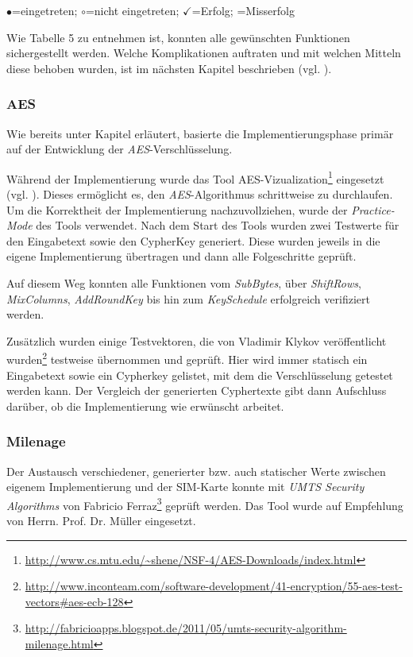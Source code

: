     \centerline{$\bullet$=eingetreten; $\circ$=nicht eingetreten; $\checkmark$=Erfolg; =Misserfolg}\vspace*{5mm}

    Wie Tabelle 5 zu entnehmen ist, konnten alle gewünschten Funktionen sichergestellt werden.
    Welche Komplikationen auftraten und mit welchen Mitteln diese behoben wurden, ist im
    nächsten Kapitel beschrieben (vgl. ).


		\subsubsection[AES (Schenkel)]{AES}
		Wie bereits unter Kapitel  erläutert, basierte die Implementierungsphase
		primär auf der Entwicklung der \textit{AES}-Verschlüsselung. 

		Während der Implementierung wurde das Tool AES-Vizualization\footnote{\url{http://www.cs.mtu.edu/~shene/NSF-4/AES-Downloads/index.html}} eingesetzt (vgl. ).
		Dieses ermöglicht es, den \textit{AES}-Algorithmus schrittweise zu durchlaufen.
		Um die Korrektheit der Implementierung nachzuvollziehen, wurde der \textit{Practice-Mode}
		des Tools verwendet. Nach dem Start des Tools wurden zwei Testwerte für den
		Eingabetext sowie den CypherKey generiert. Diese wurden jeweils in die eigene
		Implementierung übertragen und dann alle Folgeschritte geprüft.

		Auf diesem Weg konnten alle Funktionen vom \textit{SubBytes}, über \textit{ShiftRows},
		\textit{MixColumns}, \textit{AddRoundKey} bis hin zum \textit{KeySchedule} erfolgreich verifiziert
		werden.

		Zusätzlich wurden einige Testvektoren, die von Vladimir Klykov veröffentlicht
		wurden\footnote{\url{http://www.inconteam.com/software-development/41-encryption/55-aes-test-vectors\#aes-ecb-128}}
		testweise übernommen und geprüft. Hier wird immer statisch ein Eingabetext sowie ein
		Cypherkey gelistet, mit dem die Verschlüsselung getestet werden kann. Der Vergleich
		der generierten Cyphertexte gibt dann Aufschluss darüber, ob die Implementierung
		wie erwünscht arbeitet.


		\subsubsection[Milenage (Schenkel)]{Milenage}
		Der Austausch verschiedener, generierter bzw. auch statischer Werte zwischen eigenem
		Implementierung und der SIM-Karte konnte mit \textit{UMTS Security Algorithms}
		von Fabricio Ferraz\footnote{\url{http://fabricioapps.blogspot.de/2011/05/umts-security-algorithm-milenage.html}}
		geprüft werden. Das Tool wurde auf Empfehlung von Herrn. Prof. Dr. Müller eingesetzt.

